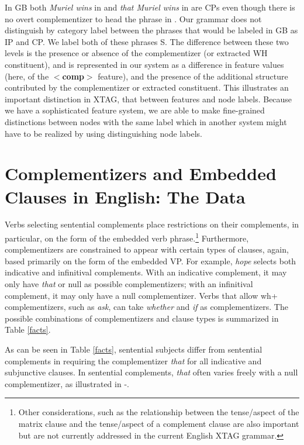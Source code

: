 
 In GB both {\it Muriel wins} in  and {\it that Muriel wins} in
 are CPs even though there is no overt complementizer to head the
phrase in .  Our grammar does not distinguish by category label
between the phrases that would be labeled in GB as IP and CP.  We label
both of these phrases S.  The difference between these two levels is the
presence or absence of the complementizer (or extracted WH constituent), and is
represented in our system as a difference in feature values (here, of the {\bf
$<$comp$>$} feature), and the presence of the additional structure contributed
by the complementizer or extracted constituent.  This illustrates an important
distinction in XTAG, that between features and node labels.  Because we have a
sophisticated feature system, we are able to make fine-grained distinctions
between nodes with the same label which in another system might have to be
realized by using distinguishing node labels.
 
\section{Complementizers and Embedded Clauses in English:  The
Data}
\label{data}

Verbs selecting sentential complements place restrictions on
their complements, in particular, on the form of the embedded verb
phrase.\footnote{Other considerations, such as the relationship between the
tense/aspect of the matrix clause and the tense/aspect of a complement clause
are also important but are not currently addressed in the current English XTAG
grammar.}  Furthermore, complementizers are constrained to appear with certain
types of clauses, again, based primarily on the form of the embedded VP.  For
example, {\it hope\/} selects both indicative and infinitival complements. With
an indicative complement, it may only have {\it that\/} or null as possible
complementizers; with an infinitival complement, it may only have a null
complementizer.  Verbs that allow wh+ complementizers, such as {\it ask}, can
take {\it whether} and {\it if} as complementizers.  The possible combinations
of complementizers and clause types is summarized in Table \ref{facts}.

As can be seen in Table \ref{facts}, sentential subjects differ from
sentential complements in requiring the complementizer {\it that\/}
for all indicative and subjunctive clauses.  In sentential complements,
{\it that\/} often varies freely with a null complementizer, as
illustrated in -.

